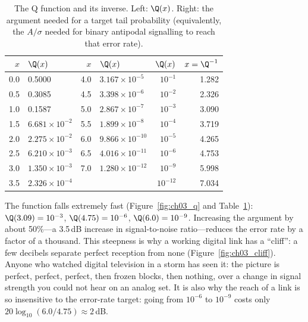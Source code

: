 \begin{table}[htbp]\centering\small
\caption{The Q function and its inverse. Left: $\Q(x)$. Right: the argument needed for a target
tail probability (equivalently, the $A/\sigma$ needed for binary antipodal signalling to reach that
error rate).}
\label{tab:ch03:q}
\begin{tabular}{@{}rl@{\qquad}rl@{\qquad}rr@{}}
\toprule
$x$ & $\Q(x)$ & $x$ & $\Q(x)$ & $\Q(x)$ & $x=\Q^{-1}$\\
\midrule
0.0 & 0.5000 & 4.0 & $3.167\times10^{-5}$ & $10^{-1}$ & 1.282\\
0.5 & 0.3085 & 4.5 & $3.398\times10^{-6}$ & $10^{-2}$ & 2.326\\
1.0 & 0.1587 & 5.0 & $2.867\times10^{-7}$ & $10^{-3}$ & 3.090\\
1.5 & $6.681\times10^{-2}$ & 5.5 & $1.899\times10^{-8}$ & $10^{-4}$ & 3.719\\
2.0 & $2.275\times10^{-2}$ & 6.0 & $9.866\times10^{-10}$ & $10^{-5}$ & 4.265\\
2.5 & $6.210\times10^{-3}$ & 6.5 & $4.016\times10^{-11}$ & $10^{-6}$ & 4.753\\
3.0 & $1.350\times10^{-3}$ & 7.0 & $1.280\times10^{-12}$ & $10^{-9}$ & 5.998\\
3.5 & $2.326\times10^{-4}$ & & & $10^{-12}$ & 7.034\\
\bottomrule
\end{tabular}
\end{table}

The function falls extremely fast (Figure~\ref{fig:ch03_q} and Table~\ref{tab:ch03:q}):
$\Q(3.09)=10^{-3}$, $\Q(4.75)=10^{-6}$, $\Q(6.0)=10^{-9}$. Increasing the argument by about
50\%---a 3.5\,dB increase in signal-to-noise ratio---reduces the error rate by a factor of a
thousand. This steepness is why a working digital link has a ``cliff'': a few decibels separate
perfect reception from none (Figure~\ref{fig:ch03_cliff}). Anyone who watched digital television
in a storm has seen it: the picture is perfect, perfect, perfect, then frozen blocks, then nothing,
over a change in signal strength you could not hear on an analog set. It is also why the reach of
a link is so insensitive to the error-rate target: going from $10^{-6}$ to $10^{-9}$ costs only
$20\log_{10}(6.0/4.75)\approx2$\,dB.


